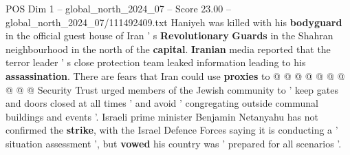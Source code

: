 \begin{textsample}{POS Dim 1 – global\_north\_2024\_07 – Score 23.00 – global\_north\_2024\_07/111492409.txt}
Haniyeh was killed with his \textbf{bodyguard} in the official guest house of Iran ' s \textbf{Revolutionary} \textbf{Guards} in the Shahran neighbourhood in the north of the \textbf{capital}. \textbf{Iranian} media reported that the terror leader ' s close protection team leaked information leading to his \textbf{assassination}.
There are fears that Iran could use \textbf{proxies} to @ @ @ @ @ @ @ @ @ @ Security Trust urged members of the Jewish community to ' keep gates and doors closed at all times ' and avoid ' congregating outside communal buildings and events '.
Israeli prime minister Benjamin Netanyahu has not confirmed the \textbf{strike}, with the Israel Defence Forces saying it is conducting a ' situation assessment ', but \textbf{vowed} his country was ' prepared for all scenarios '.

\end{textsample}
